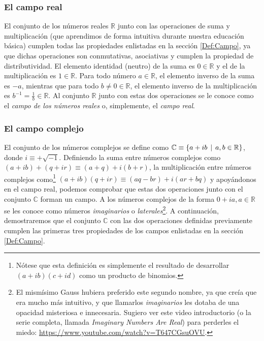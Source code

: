 \documentclass[12pt,dvipsnames]{article}
\begin{document}
\subsubsection{El campo real}

El conjunto de los números reales $\mathbb{R}$ junto con las operaciones de suma y multiplicación (que aprendimos de forma intuitiva durante nuestra educación básica) cumplen todas las propiedades enlistadas en la sección \ref{Def:Campo}, ya que dichas operaciones son conmutativas, asociativas y cumplen la propiedad de distributividad. El elemento identidad (neutro) de la suma es $0\in\mathbb{R}$ y el de la multiplicación es $1\in\mathbb{R}$. Para todo número $a\in\mathbb{R}$, el elemento inverso de la suma es $-a$, mientras que para todo $b\neq0\in\mathbb{R}$, el elemento inverso de la multiplicación es $b^{-1} = \frac{1}{b}\in\mathbb{R}$. Al conjunto $\mathbb{R}$ junto con estas dos operaciones se le conoce como el \emph{campo de los números reales} o, simplemente, el \emph{campo real}.

\subsubsection{El campo complejo} \label{Ejem:Campo_complejo}

El conjunto de los números complejos se define como $\mathbb{C} \equiv \{a+ib\hspace{1.5mm}|\hspace{1.5mm}a,b\in\mathbb{R}\}$, donde $i\equiv+\sqrt{-1}$. Definiendo la suma entre números complejos como $(a+ib)+(q+ir)\equiv(a+q) + i(b+r)$, la multiplicación entre números complejos como\footnote{Nótese que esta definición es simplemente el resultado de desarrollar $(a+ib)(c+id)$ como un producto de binomios.} $(a+ib)(q+ir)\equiv (aq-br) + i(ar+bq)$ y apoyándonos en el campo real, podemos comprobar que estas dos operaciones junto con el conjunto $\mathbb{C}$ forman un campo. A los números complejos de la forma $0+ia, a\in\mathbb{R}$ se les conoce como números \emph{imaginarios} o \emph{laterales}\footnote{El mismísimo Gauss hubiera preferido este segundo nombre, ya que creía que era mucho más intuitivo, y que llamarlos \emph{imaginarios} les dotaba de una opacidad misteriosa e innecesaria. Sugiero ver este video introductorio (o la serie completa, llamada \emph{Imaginary Numbers Are Real}) para perderles el miedo: \url{https://www.youtube.com/watch?v=T647CGsuOVU}.}. A continuación, demostraremos que el conjunto $\mathbb{C}$ con las dos operaciones definidas previamente cumplen las primeras tres propiedades de los campos enlistadas en la sección \ref{Def:Campo}.
\end{document}
